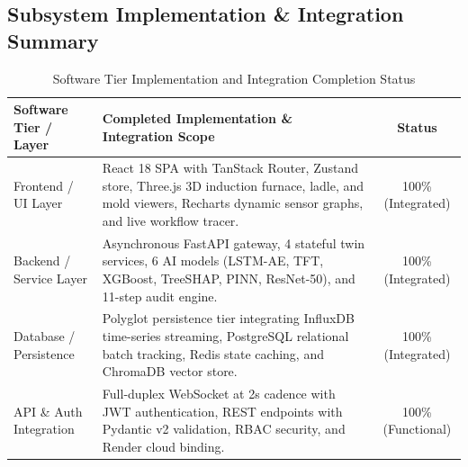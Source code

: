 \documentclass[11pt, a4paper]{article}
\begin{document}
\subsection{Subsystem Implementation \& Integration Summary}
\begin{table}[H]
    \centering
    \footnotesize
    \renewcommand{\arraystretch}{1.25}
    \begin{tabular}{|p{3.5cm}|p{7.8cm}|c|}
        \hline
        \textbf{Software Tier / Layer} & \textbf{Completed Implementation \& Integration Scope} & \textbf{Status} \\
        \hline
        Frontend / UI Layer & React 18 SPA with TanStack Router, Zustand store, Three.js 3D induction furnace, ladle, and mold viewers, Recharts dynamic sensor graphs, and live workflow tracer. & 100\% (Integrated) \\
        \hline
        Backend / Service Layer & Asynchronous FastAPI gateway, 4 stateful twin services, 6 AI models (LSTM-AE, TFT, XGBoost, TreeSHAP, PINN, ResNet-50), and 11-step audit engine. & 100\% (Integrated) \\
        \hline
        Database / Persistence & Polyglot persistence tier integrating InfluxDB time-series streaming, PostgreSQL relational batch tracking, Redis state caching, and ChromaDB vector store. & 100\% (Integrated) \\
        \hline
        API \& Auth Integration & Full-duplex WebSocket at 2s cadence with JWT authentication, REST endpoints with Pydantic v2 validation, RBAC security, and Render cloud binding. & 100\% (Functional) \\
        \hline
    \end{tabular}
    \caption{Software Tier Implementation and Integration Completion Status}
    \label{tab:tier-status}
\end{table}
\end{document}
